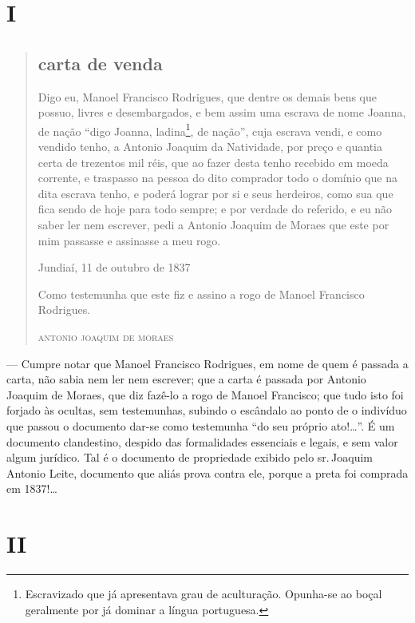 \section{I}

\begin{quote}
\subsection{carta de venda}

Digo eu, Manoel Francisco Rodrigues, que dentre os demais bens que
possuo, livres e desembargados, e bem assim uma escrava de nome Joanna,
de nação ``digo Joanna, ladina\footnote{ Escravizado que já apresentava
  grau de aculturação. Opunha-se ao boçal geralmente por já dominar a
  língua portuguesa.}, de nação'', cuja escrava vendi, e como vendido
tenho, a Antonio Joaquim da Natividade, por preço e quantia certa de
trezentos mil réis, que ao fazer desta tenho recebido em moeda corrente,
e traspasso na pessoa do dito comprador todo o domínio que na dita
escrava tenho, e poderá lograr por si e seus herdeiros, como sua que
fica sendo de hoje para todo sempre; e por verdade do referido, e eu não
saber ler nem escrever, pedi a Antonio Joaquim de Moraes que este por
mim passasse e assinasse a meu rogo.

\begin{flushright}
Jundiaí, 11 de outubro de 1837

Como testemunha que este fiz e assino a rogo de Manoel Francisco Rodrigues.

\textsc{antonio joaquim de moraes}
\end{flushright}
\end{quote}

--- Cumpre notar que Manoel Francisco Rodrigues, em nome de quem é
passada a carta, não sabia nem ler nem escrever; que a carta é passada
por Antonio Joaquim de Moraes, que diz fazê-lo a rogo de Manoel
Francisco; que tudo isto foi forjado às ocultas, sem testemunhas,
subindo o escândalo ao ponto de o indivíduo que passou o documento
dar-se como testemunha ``do seu próprio ato!\ldots{}''. É um documento
clandestino, despido das formalidades essenciais e legais, e sem valor
algum jurídico. Tal é o documento de propriedade exibido pelo sr.\,Joaquim Antonio Leite, documento que aliás prova contra ele, porque a
preta foi comprada em 1837!\ldots{}

\section{II}

